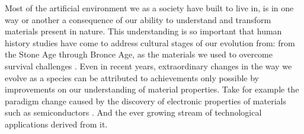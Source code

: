 Most of the artificial environment we as a society have built to live in, is in one way or another a consequence of our ability to understand and transform materials present in nature. This understanding is so important that human history studies have come to address cultural stages of our evolution from: from the Stone Age through Bronce Age, as the materials we used to overcome survival challenges \cite{Joannopoulos2008}. Even in recent years, extraordinary changes in the way we evolve as a species can be attributed to achievements only possible by improvements on our understanding of material properties. Take for example the paradigm change caused by the discovery of electronic properties of materials such as semiconductors \cite{Obayya2011}. And the ever growing stream of technological applications derived from it.

